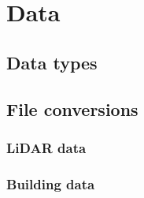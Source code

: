 \chapter{Data}

\section{Data types}


\section{File conversions}

\subsection{LiDAR data}


\subsection{Building data}

